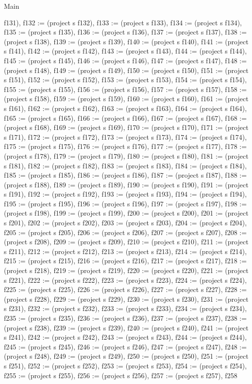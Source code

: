 \begin{lexlean}{Main}
\begin{semanticmodule}
{f131), f132 := (project s f132), f133 := (project s f133), f134 := (project s f134), f135 := (project s f135), f136 := (project s f136), f137 := (project s f137), f138 := (project s f138), f139 := (project s f139), f140 := (project s f140), f141 := (project s f141), f142 := (project s f142), f143 := (project s f143), f144 := (project s f144), f145 := (project s f145), f146 := (project s f146), f147 := (project s f147), f148 := (project s f148), f149 := (project s f149), f150 := (project s f150), f151 := (project s f151), f152 := (project s f152), f153 := (project s f153), f154 := (project s f154), f155 := (project s f155), f156 := (project s f156), f157 := (project s f157), f158 := (project s f158), f159 := (project s f159), f160 := (project s f160), f161 := (project s f161), f162 := (project s f162), f163 := (project s f163), f164 := (project s f164), f165 := (project s f165), f166 := (project s f166), f167 := (project s f167), f168 := (project s f168), f169 := (project s f169), f170 := (project s f170), f171 := (project s f171), f172 := (project s f172), f173 := (project s f173), f174 := (project s f174), f175 := (project s f175), f176 := (project s f176), f177 := (project s f177), f178 := (project s f178), f179 := (project s f179), f180 := (project s f180), f181 := (project s f181), f182 := (project s f182), f183 := (project s f183), f184 := (project s f184), f185 := (project s f185), f186 := (project s f186), f187 := (project s f187), f188 := (project s f188), f189 := (project s f189), f190 := (project s f190), f191 := (project s f191), f192 := (project s f192), f193 := (project s f193), f194 := (project s f194), f195 := (project s f195), f196 := (project s f196), f197 := (project s f197), f198 := (project s f198), f199 := (project s f199), f200 := (project s f200), f201 := (project s f201), f202 := (project s f202), f203 := (project s f203), f204 := (project s f204), f205 := (project s f205), f206 := (project s f206), f207 := (project s f207), f208 := (project s f208), f209 := (project s f209), f210 := (project s f210), f211 := (project s f211), f212 := (project s f212), f213 := (project s f213), f214 := (project s f214), f215 := (project s f215), f216 := (project s f216), f217 := (project s f217), f218 := (project s f218), f219 := (project s f219), f220 := (project s f220), f221 := (project s f221), f222 := (project s f222), f223 := (project s f223), f224 := (project s f224), f225 := (project s f225), f226 := (project s f226), f227 := (project s f227), f228 := (project s f228), f229 := (project s f229), f230 := (project s f230), f231 := (project s f231), f232 := (project s f232), f233 := (project s f233), f234 := (project s f234), f235 := (project s f235), f236 := (project s f236), f237 := (project s f237), f238 := (project s f238), f239 := (project s f239), f240 := (project s f240), f241 := (project s f241), f242 := (project s f242), f243 := (project s f243), f244 := (project s f244), f245 := (project s f245), f246 := (project s f246), f247 := (project s f247), f248 := (project s f248), f249 := (project s f249), f250 := (project s f250), f251 := (project s f251), f252 := (project s f252), f253 := (project s f253), f254 := (project s f254), f255 := (project s f255), f256 := (project s f256), f257 := (project s f257), f258 }
\end{semanticmodule}
\end{lexlean}
